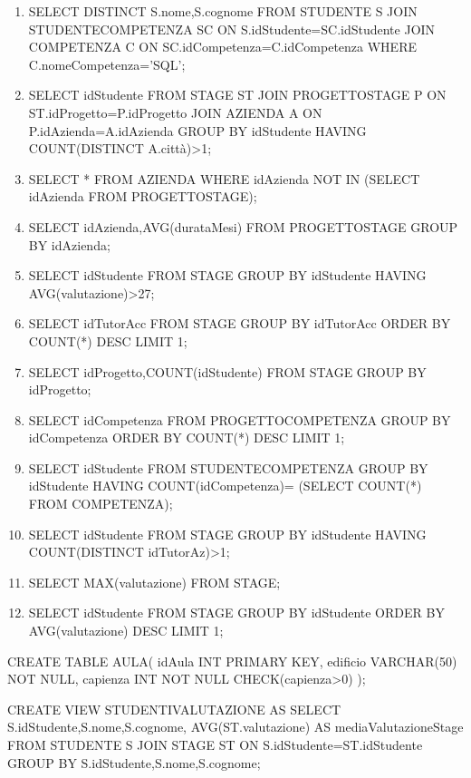 \documentclass[a4paper,11pt]{article}
\begin{document}
\begin{enumerate}
		\item SELECT DISTINCT S.nome,S.cognome
		FROM STUDENTE S
		JOIN STUDENTECOMPETENZA SC
		ON S.idStudente=SC.idStudente
		JOIN COMPETENZA C
		ON SC.idCompetenza=C.idCompetenza
		WHERE C.nomeCompetenza='SQL';
		
		\item SELECT idStudente
		FROM STAGE ST
		JOIN PROGETTOSTAGE P
		ON ST.idProgetto=P.idProgetto
		JOIN AZIENDA A
		ON P.idAzienda=A.idAzienda
		GROUP BY idStudente
		HAVING COUNT(DISTINCT A.città)>1;
		
		\item SELECT *
		FROM AZIENDA
		WHERE idAzienda NOT IN
		(SELECT idAzienda FROM PROGETTOSTAGE);
		
		\item SELECT idAzienda,AVG(durataMesi)
		FROM PROGETTOSTAGE
		GROUP BY idAzienda;
		
		\item SELECT idStudente
		FROM STAGE
		GROUP BY idStudente
		HAVING AVG(valutazione)>27;
		
		\item SELECT idTutorAcc
		FROM STAGE
		GROUP BY idTutorAcc
		ORDER BY COUNT(*) DESC
		LIMIT 1;
		
		\item SELECT idProgetto,COUNT(idStudente)
		FROM STAGE
		GROUP BY idProgetto;
		
		\item SELECT idCompetenza
		FROM PROGETTOCOMPETENZA
		GROUP BY idCompetenza
		ORDER BY COUNT(*) DESC
		LIMIT 1;
		
		\item SELECT idStudente
		FROM STUDENTECOMPETENZA
		GROUP BY idStudente
		HAVING COUNT(idCompetenza)=
		(SELECT COUNT(*) FROM COMPETENZA);
		
		\item SELECT idStudente
		FROM STAGE
		GROUP BY idStudente
		HAVING COUNT(DISTINCT idTutorAz)>1;
		
		\item SELECT MAX(valutazione)
		FROM STAGE;
		
		\item SELECT idStudente
		FROM STAGE
		GROUP BY idStudente
		ORDER BY AVG(valutazione) DESC
		LIMIT 1;
		
	\end{enumerate}
	
	CREATE TABLE AULA(
	idAula INT PRIMARY KEY,
	edificio VARCHAR(50) NOT NULL,
	capienza INT NOT NULL CHECK(capienza>0)
	);
	
	CREATE VIEW STUDENTIVALUTAZIONE AS
	SELECT S.idStudente,S.nome,S.cognome,
	AVG(ST.valutazione) AS mediaValutazioneStage
	FROM STUDENTE S
	JOIN STAGE ST
	ON S.idStudente=ST.idStudente
	GROUP BY S.idStudente,S.nome,S.cognome;
	
\end{document}
